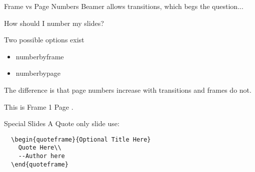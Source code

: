 \documentclass[xcolor=table,compress,pdfpagelabels]{beamer}
\begin{document}
\begin{frame}[fragile]{Frame vs Page Numbers}
Beamer allows transitions, which begs the question...\\
\begin{block}{}
\begin{center}How should I number my slides?\end{center}
\end{block}
Two possible options exist
\begin{itemize}
  \item numberbyframe
  \item numberbypage 
\end{itemize}
The difference is that page numbers \alert{increase} with transitions and frames do not.
\begin{example}
\begin{center}
This is Frame \alert{1} Page \alert{}.
\end{center}
\end{example}
\end{frame}

\begin{frame}[fragile]{Special Slides}
 A Quote only slide use:
  \begin{verbatim}
  \begin{quoteframe}{Optional Title Here}
    Quote Here\\
    --Author here
  \end{quoteframe}
  \end{verbatim}
 
\end{frame}
\end{document}
